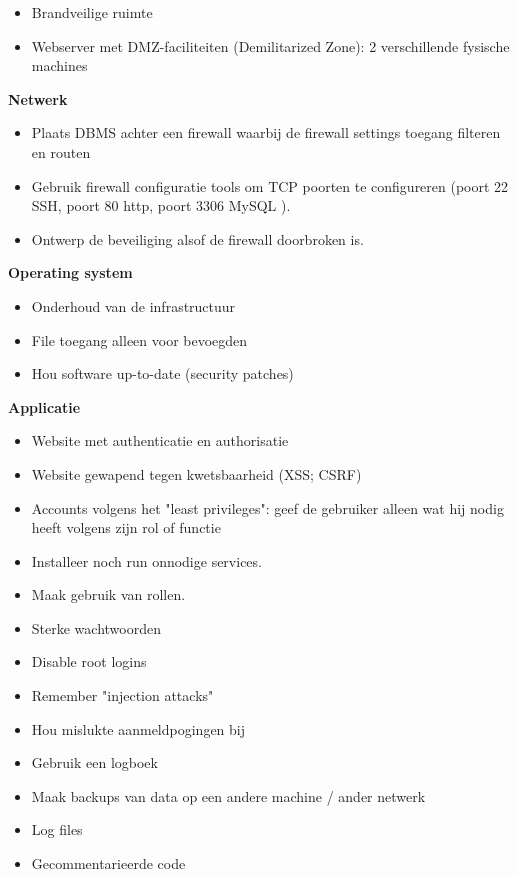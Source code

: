 \documentclass{article}
\newcommand{\bold}[1]{\textbf{#1}}
\begin{document}
\begin{itemize}
    \item Brandveilige ruimte
    \item Webserver met DMZ-faciliteiten (Demilitarized Zone): 2 verschillende fysische machines
\end{itemize}

\bold{Netwerk}

\begin{itemize}
    \item Plaats DBMS achter een firewall waarbij de firewall settings toegang filteren en routen
    \item Gebruik firewall configuratie tools om TCP poorten te configureren (poort 22 SSH, poort 80 http, poort 3306 MySQL ).
    \item Ontwerp de beveiliging alsof de firewall doorbroken is.
\end{itemize}

\bold{Operating system}

\begin{itemize}
    \item Onderhoud van de infrastructuur
    \item File toegang alleen voor bevoegden
    \item Hou software up-to-date (security patches)
\end{itemize}

\bold{Applicatie}

\begin{itemize}
    \item Website met authenticatie en authorisatie
    \item Website gewapend tegen kwetsbaarheid (XSS; CSRF)
    \item Accounts volgens het "least privileges": geef de gebruiker alleen wat hij nodig heeft volgens zijn rol of functie
    \item Installeer noch run onnodige services.
    \item Maak gebruik van rollen.
    \item Sterke wachtwoorden
    \item Disable root logins
    \item Remember "injection attacks"
    \item Hou mislukte aanmeldpogingen bij
    \item Gebruik een logboek
    \item Maak backups van data op een andere machine / ander netwerk
    \item Log files
    \item Gecommentarieerde code
\end{itemize}
\end{document}
